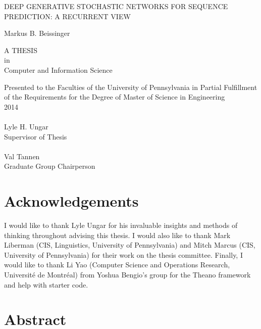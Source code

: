 \documentclass[12pt, titlepage]{report}
\begin{document}
	\doublespacing
	
	\begin{titlepage}
		\begin{center}
			{\singlespacing \LARGE \uppercase{Deep Generative Stochastic Networks for Sequence Prediction: a Recurrent View}\\[12pt]}
			
			{\Large Markus B. Beissinger\\[12pt]}
			
			\uppercase{a thesis}\\[12pt]					
			in\\			
			{\Large Computer and Information Science\\[48pt]}
			
			Presented to the Faculties of the University of Pennsylvania in Partial Fulfillment of the Requirements for the Degree of Master of Science in Engineering\\[12pt]
			
			2014\\[36pt]
			
			\singlespacing
			\makebox[2.5in]{\hrulefill}\\
			Lyle H. Ungar\\
			Supervisor of Thesis\\[36pt]
			
			\makebox[2.5in]{\hrulefill}\\
			Val Tannen\\
			Graduate Group Chairperson
			
			\doublespacing
		\end{center}
	\end{titlepage}
	

	\chapter*{Acknowledgements}
	I would like to thank Lyle Ungar for his invaluable insights and methods of thinking throughout advising this thesis. I would also like to thank Mark Liberman (CIS, Linguistics, University of Pennsylvania) and Mitch Marcus (CIS, University of Pennsylvania) for their work on the thesis committee. Finally, I would like to thank Li Yao (Computer Science and Operations Research, Universit\'{e} de Montr\'{e}al) from Yoshua Bengio\rq{}s group for the Theano framework and help with starter code.
	
	\chapter*{Abstract}
	
	
\end{document}
